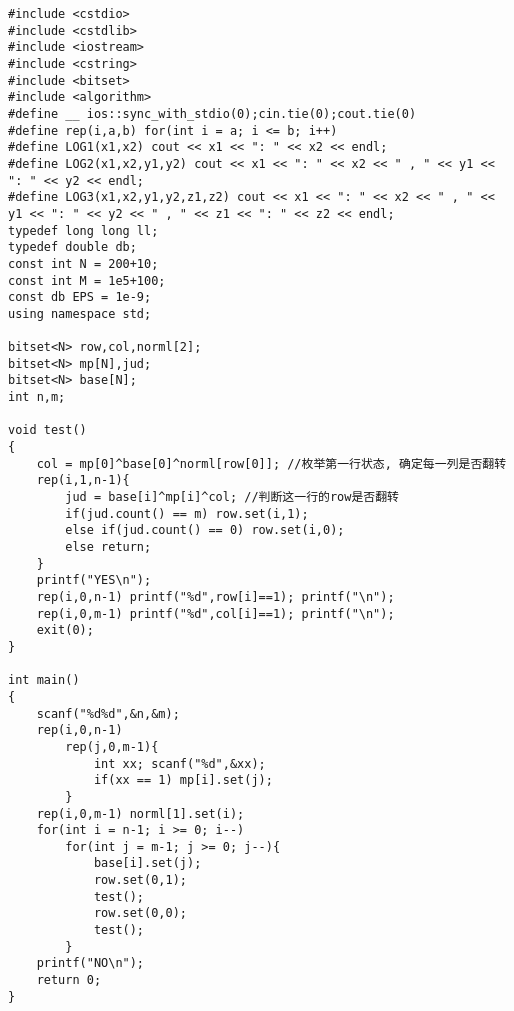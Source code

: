 \documentclass[twoside]{article}
\begin{document}
\begin{lstlisting}
#include <cstdio>
#include <cstdlib>
#include <iostream>
#include <cstring>
#include <bitset>
#include <algorithm>
#define __ ios::sync_with_stdio(0);cin.tie(0);cout.tie(0)
#define rep(i,a,b) for(int i = a; i <= b; i++)
#define LOG1(x1,x2) cout << x1 << ": " << x2 << endl;
#define LOG2(x1,x2,y1,y2) cout << x1 << ": " << x2 << " , " << y1 << ": " << y2 << endl;
#define LOG3(x1,x2,y1,y2,z1,z2) cout << x1 << ": " << x2 << " , " << y1 << ": " << y2 << " , " << z1 << ": " << z2 << endl;
typedef long long ll;
typedef double db;
const int N = 200+10;
const int M = 1e5+100;
const db EPS = 1e-9;
using namespace std;

bitset<N> row,col,norml[2];
bitset<N> mp[N],jud;
bitset<N> base[N];
int n,m;

void test()
{
	col = mp[0]^base[0]^norml[row[0]]; //枚举第一行状态, 确定每一列是否翻转
	rep(i,1,n-1){
		jud = base[i]^mp[i]^col; //判断这一行的row是否翻转
		if(jud.count() == m) row.set(i,1);
		else if(jud.count() == 0) row.set(i,0);
		else return;
	}
	printf("YES\n");
	rep(i,0,n-1) printf("%d",row[i]==1); printf("\n");
	rep(i,0,m-1) printf("%d",col[i]==1); printf("\n");
	exit(0);
}

int main()
{
	scanf("%d%d",&n,&m);
	rep(i,0,n-1)
		rep(j,0,m-1){
			int xx; scanf("%d",&xx);
			if(xx == 1) mp[i].set(j);
		}
	rep(i,0,m-1) norml[1].set(i);
	for(int i = n-1; i >= 0; i--)
		for(int j = m-1; j >= 0; j--){
			base[i].set(j);
			row.set(0,1);
			test();
			row.set(0,0);
			test();
		}
	printf("NO\n");
	return 0;
}\end{lstlisting}
\end{document}
